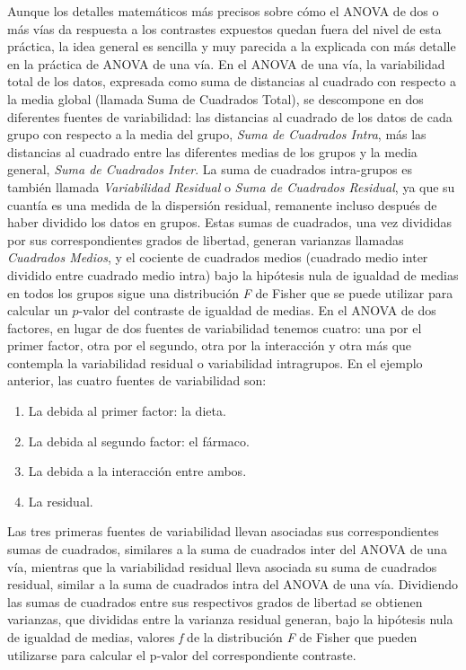 \documentclass[
  spanish,
  a4paper,
]{scrreport}
\providecommand{\tightlist}{%
  \setlength{\itemsep}{0pt}\setlength{\parskip}{0pt}}
\theoremstyle{plain}
\theoremstyle{definition}
\theoremstyle{definition}
\theoremstyle{remark}
\begin{document}
Aunque los detalles matemáticos más precisos sobre cómo el ANOVA de dos
o más vías da respuesta a los contrastes expuestos quedan fuera del
nivel de esta práctica, la idea general es sencilla y muy parecida a la
explicada con más detalle en la práctica de ANOVA de una vía. En el
ANOVA de una vía, la variabilidad total de los datos, expresada como
suma de distancias al cuadrado con respecto a la media global (llamada
Suma de Cuadrados Total), se descompone en dos diferentes fuentes de
variabilidad: las distancias al cuadrado de los datos de cada grupo con
respecto a la media del grupo, \emph{Suma de Cuadrados Intra}, más las
distancias al cuadrado entre las diferentes medias de los grupos y la
media general, \emph{Suma de Cuadrados Inter}. La suma de cuadrados
intra-grupos es también llamada \emph{Variabilidad Residual} o
\emph{Suma de Cuadrados Residual}, ya que su cuantía es una medida de la
dispersión residual, remanente incluso después de haber dividido los
datos en grupos. Estas sumas de cuadrados, una vez divididas por sus
correspondientes grados de libertad, generan varianzas llamadas
\emph{Cuadrados Medios}, y el cociente de cuadrados medios (cuadrado
medio inter dividido entre cuadrado medio intra) bajo la hipótesis nula
de igualdad de medias en todos los grupos sigue una distribución
\emph{F} de Fisher que se puede utilizar para calcular un \(p\)-valor
del contraste de igualdad de medias. En el ANOVA de dos factores, en
lugar de dos fuentes de variabilidad tenemos cuatro: una por el primer
factor, otra por el segundo, otra por la interacción y otra más que
contempla la variabilidad residual o variabilidad intragrupos. En el
ejemplo anterior, las cuatro fuentes de variabilidad son:

\begin{enumerate}
\def\labelenumi{\arabic{enumi}.}
\tightlist
\item
  La debida al primer factor: la dieta.
\item
  La debida al segundo factor: el fármaco.
\item
  La debida a la interacción entre ambos.
\item
  La residual.
\end{enumerate}

Las tres primeras fuentes de variabilidad llevan asociadas sus
correspondientes sumas de cuadrados, similares a la suma de cuadrados
inter del ANOVA de una vía, mientras que la variabilidad residual lleva
asociada su suma de cuadrados residual, similar a la suma de cuadrados
intra del ANOVA de una vía. Dividiendo las sumas de cuadrados entre sus
respectivos grados de libertad se obtienen varianzas, que divididas
entre la varianza residual generan, bajo la hipótesis nula de igualdad
de medias, valores \emph{f} de la distribución \emph{F} de Fisher que
pueden utilizarse para calcular el p-valor del correspondiente
contraste.
\end{document}
